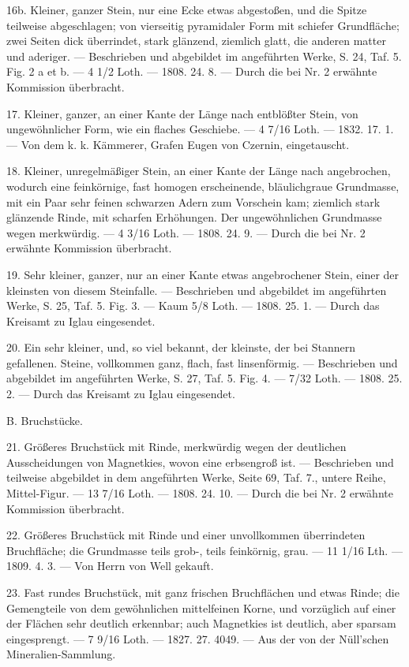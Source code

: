 \documentclass[a4paper, 11pt, oneside, polutonikogreek, german]{article}
\begin{document}
16b. Kleiner, ganzer Stein, nur eine Ecke etwas abgestoßen, und die Spitze teilweise abgeschlagen; von vierseitig pyramidaler Form mit schiefer Grundfläche; zwei Seiten dick überrindet, stark glänzend, ziemlich glatt, die anderen matter und aderiger. — Beschrieben und abgebildet im angeführten Werke, S. 24, Taf. 5. Fig. 2 a et b. — 4 1/2 Loth. — 1808. 24. 8. — Durch die bei Nr. 2 erwähnte Kommission überbracht.

17. Kleiner, ganzer, an einer Kante der Länge nach entblößter Stein, von ungewöhnlicher Form, wie ein flaches Geschiebe. — 4 7/16 Loth. — 1832. 17. 1. — Von dem k. k. Kämmerer, Grafen Eugen von Czernin, eingetauscht.

18. Kleiner, unregelmäßiger Stein, an einer Kante der Länge nach angebrochen, wodurch eine feinkörnige, fast homogen erscheinende, bläulichgraue Grundmasse, mit ein Paar sehr feinen schwarzen Adern zum Vorschein kam; ziemlich stark glänzende Rinde, mit scharfen Erhöhungen. Der ungewöhnlichen Grundmasse wegen merkwürdig. — 4 3/16 Loth. — 1808. 24. 9. — Durch die bei Nr. 2 erwähnte Kommission überbracht.

19. Sehr kleiner, ganzer, nur an einer Kante etwas angebrochener Stein, einer der kleinsten von diesem Steinfalle. — Beschrieben und abgebildet im angeführten Werke, S. 25, Taf. 5. Fig. 3. — Kaum 5/8 Loth. — 1808. 25. 1. — Durch das Kreisamt zu Iglau eingesendet.

20. Ein sehr kleiner, und, so viel bekannt, der kleinste, der bei Stannern gefallenen. Steine, vollkommen ganz, flach, fast linsenförmig. — Beschrieben und abgebildet im angeführten Werke, S. 27, Taf. 5. Fig. 4. — 7/32 Loth. — 1808. 25. 2. — Durch das Kreisamt zu Iglau eingesendet.

B. Bruchstücke.

21. Größeres Bruchstück mit Rinde, merkwürdig wegen der deutlichen Ausscheidungen von Magnetkies, wovon eine erbsengroß ist. — Beschrieben und teilweise abgebildet in dem angeführten Werke, Seite 69, Taf. 7., untere Reihe, Mittel-Figur. — 13 7/16 Loth. — 1808. 24. 10. — Durch die bei Nr. 2 erwähnte Kommission überbracht.

22. Größeres Bruchstück mit Rinde und einer unvollkommen überrindeten Bruchfläche; die Grundmasse teils grob-, teils feinkörnig, grau. — 11 1/16 Lth. — 1809. 4. 3. — Von Herrn von Well gekauft.

23. Fast rundes Bruchstück, mit ganz frischen Bruchflächen und etwas Rinde; die Gemengteile von dem gewöhnlichen mittelfeinen Korne, und vorzüglich auf einer der Flächen sehr deutlich erkennbar; auch Magnetkies ist deutlich, aber sparsam eingesprengt. — 7 9/16 Loth. — 1827. 27. 4049. — Aus der von der Nüll’schen Mineralien-Sammlung.
\end{document}
